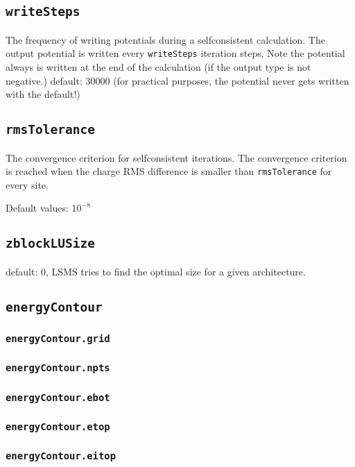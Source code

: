 \subsection{\texttt{writeSteps}}
The frequency of writing potentials during a selfconsistent
calculation. The output potential is written every \texttt{writeSteps}
iteration steps. Note the potential always is written at the end of
the calculation (if the output type is not negative.)
default: 30000 (for practical purposes, the potential never gets
written with the default!)

\subsection{\texttt{rmsTolerance}}
The convergence criterion for selfconsistent iterations. The convergence criterion is reached when
the charge RMS difference is smaller than \texttt{rmsTolerance} for every site.

Default values: $10^{-8}$

\subsection{\texttt{zblockLUSize}}
default: 0, LSMS tries to find the optimal size for a given architecture.

\subsection{\texttt{energyContour}}

\subsubsection{\texttt{energyContour.grid}}

\subsubsection{\texttt{energyContour.npts}}

\subsubsection{\texttt{energyContour.ebot}}

\subsubsection{\texttt{energyContour.etop}}

\subsubsection{\texttt{energyContour.eitop}}

